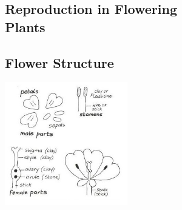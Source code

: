 \begin{multicols}{2}
%
%


\section*{Reproduction in Flowering \hfill \\  Plants}  


\subsection{Flower Structure} %

\begin{center}
\includegraphics[width=0.4\textwidth]{./img/vso/flower-structure.jpg}
\end{center}


\end{multicols}
